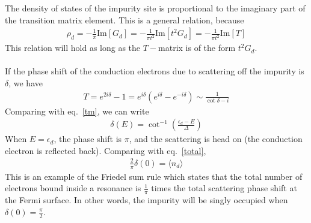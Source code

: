 \documentclass[twoside,11pt]{report}
\numberwithin{equation}{section}
\begin{document}
The density of states of the impurity site is proportional to the imaginary part of the transition matrix element.
This is a general relation, because
\begin{equation}\begin{aligned}
	\rho_d = -\frac{1}{\pi}\text{Im}\left[G_d\right] = -\frac{1}{\pi t^2}\text{Im}\left[t^2 G_d\right] = -\frac{1}{\pi t^2}\text{Im}\left[T\right]
\end{aligned}\end{equation}
This relation will hold as long as the \(T-\)matrix is of the form \(t^2 G_d\).
\\\\
If the phase shift of the conduction electrons due to scattering off the impurity is \(\delta\), we have
\begin{equation}\begin{aligned}
	T = e^{2i\delta} - 1 = e^{i\delta}\left(e^{i\delta} - e^{-i\delta}\right) \sim \frac{1}{\cot \delta - i}
\end{aligned}\end{equation}
Comparing with eq.~\ref{tm}, we can write
\begin{equation}\begin{aligned}
	\label{phaseshift}
	\delta(E) = \cot^{-1}\left(\frac{\epsilon_d - E}{\Delta}\right)
\end{aligned}\end{equation}
When \(E = \epsilon_d\), the phase shift is \(\pi\), and the scattering is head on (the conduction electron is reflected back).
Comparing with eq.~\ref{total},
\begin{equation}\begin{aligned}
	\frac{2}{\pi}\delta(0) = \langle  n_d\rangle
\end{aligned}\end{equation}
This is an example of the Friedel sum rule which states that the total number of electrons bound inside a resonance is \(\frac{1}{\pi}\) times the total scattering phase shift at the Fermi surface.
In other words, the impurity will be singly occupied when \(\delta(0) = \frac{\pi}{2}\).
\end{document}

